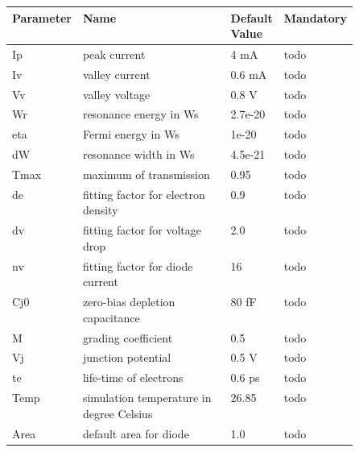 \begin{tabular}{|l|p{0.5\linewidth}|l|l|}
\hline
Parameter & Name & Default Value & Mandatory \\
\hline
Ip & peak current & 4 mA & todo \\
Iv & valley current & 0.6 mA & todo \\
Vv & valley voltage & 0.8 V & todo \\
Wr & resonance energy in Ws & 2.7e-20 & todo \\
eta & Fermi energy in Ws & 1e-20 & todo \\
dW & resonance width in Ws & 4.5e-21 & todo \\
Tmax & maximum of transmission & 0.95 & todo \\
de & fitting factor for electron density & 0.9 & todo \\
dv & fitting factor for voltage drop & 2.0 & todo \\
nv & fitting factor for diode current & 16 & todo \\
Cj0 & zero-bias depletion capacitance & 80 fF & todo \\
M & grading coefficient & 0.5 & todo \\
Vj & junction potential & 0.5 V & todo \\
te & life-time of electrons & 0.6 ps & todo \\
Temp & simulation temperature in degree Celsius & 26.85 & todo \\
Area & default area for diode & 1.0 & todo \\
\hline
\end{tabular}




